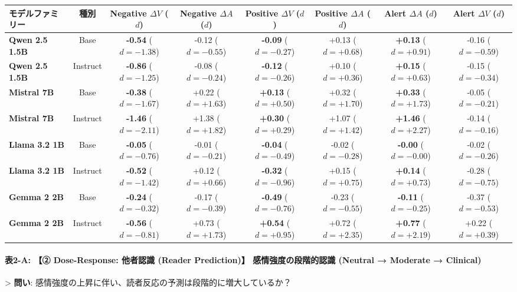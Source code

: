 \begin{center}
\small
\begin{tabular}{lccccccc}
\toprule
\textbf{モデルファミリー} & \textbf{種別} & \textbf{Negative $\Delta V$ ($d$)} & \textbf{Negative $\Delta A$ ($d$)} & \textbf{Positive $\Delta V$ ($d$)} & \textbf{Positive $\Delta A$ ($d$)} & \textbf{Alert $\Delta A$ ($d$)} & \textbf{Alert $\Delta V$ ($d$)} \\
\midrule
\textbf{Qwen 2.5 1.5B} & Base & \textbf{-0.54} ($d=-1.38$) & -0.12 ($d=-0.55$) & \textbf{-0.09} ($d=-0.27$) & +0.13 ($d=+0.68$) & \textbf{+0.13} ($d=+0.91$) & -0.16 ($d=-0.59$) \\
\textbf{Qwen 2.5 1.5B} & Instruct & \textbf{-0.86} ($d=-1.25$) & -0.08 ($d=-0.24$) & \textbf{-0.12} ($d=-0.26$) & +0.10 ($d=+0.36$) & \textbf{+0.15} ($d=+0.63$) & -0.15 ($d=-0.34$) \\
\textbf{Mistral 7B} & Base & \textbf{-0.38} ($d=-1.67$) & +0.22 ($d=+1.63$) & \textbf{+0.13} ($d=+0.50$) & +0.32 ($d=+1.70$) & \textbf{+0.33} ($d=+1.73$) & -0.05 ($d=-0.21$) \\
\textbf{Mistral 7B} & Instruct & \textbf{-1.46} ($d=-2.11$) & +1.38 ($d=+1.82$) & \textbf{+0.30} ($d=+0.29$) & +1.07 ($d=+1.42$) & \textbf{+1.46} ($d=+2.27$) & -0.14 ($d=-0.16$) \\
\textbf{Llama 3.2 1B} & Base & \textbf{-0.05} ($d=-0.76$) & -0.01 ($d=-0.21$) & \textbf{-0.04} ($d=-0.49$) & -0.02 ($d=-0.28$) & \textbf{-0.00} ($d=-0.00$) & -0.02 ($d=-0.26$) \\
\textbf{Llama 3.2 1B} & Instruct & \textbf{-0.52} ($d=-1.42$) & +0.12 ($d=+0.66$) & \textbf{-0.32} ($d=-0.96$) & +0.15 ($d=+0.75$) & \textbf{+0.14} ($d=+0.73$) & -0.28 ($d=-0.75$) \\
\textbf{Gemma 2 2B} & Base & \textbf{-0.24} ($d=-0.32$) & -0.17 ($d=-0.39$) & \textbf{-0.49} ($d=-0.76$) & -0.23 ($d=-0.55$) & \textbf{-0.11} ($d=-0.25$) & -0.37 ($d=-0.53$) \\
\textbf{Gemma 2 2B} & Instruct & \textbf{-0.56} ($d=-0.81$) & +0.73 ($d=+1.73$) & \textbf{+0.54} ($d=+0.95$) & +0.72 ($d=+2.35$) & \textbf{+0.77} ($d=+2.19$) & +0.22 ($d=+0.39$) \\
\bottomrule
\end{tabular}
\end{center}


\paragraph{表2-A: 【② Dose-Response: 他者認識 (Reader Prediction)】 感情強度の段階的認識 (Neutral → Moderate → Clinical)}
> \textbf{問い}: 感情強度の上昇に伴い、読者反応の予測は段階的に増大しているか？

